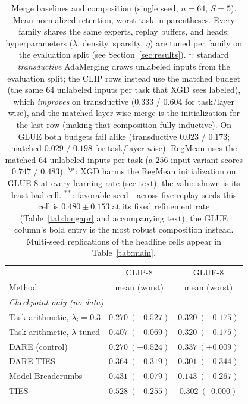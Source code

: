 \documentclass{article} %
\begin{document}
\begin{table}[t]
\centering
\small
\caption{Merge baselines and composition (single seed, $n=64$, $S=5$). Mean normalized retention, worst-task in parentheses. Every family shares the same experts, replay buffers, and heads; hyperparameters ($\lambda$, density, sparsity, $\eta$) are tuned per family on the evaluation split (see Section~\ref{sec:results}). $^\ddagger$: standard \emph{transductive} AdaMerging draws unlabeled inputs from the evaluation split; the CLIP rows instead use the matched budget (the same $64$ unlabeled inputs per task that XGD sees labeled), which \emph{improves} on transductive ($0.333$ / $0.604$ for task/layer wise), and the matched layer-wise merge is the initialization for the last row (making that composition fully inductive). On GLUE both budgets fail alike (transductive $0.023$ / $0.173$; matched $0.029$ / $0.198$ for task/layer wise). RegMean uses the matched $64$ unlabeled inputs per task (a $256$-input variant scores $0.747$ / $0.483$). $^\P$: XGD harms the RegMean initialization on GLUE-8 at every learning rate (see text); the value shown is its least-bad cell. $^{**}$: favorable seed---across five replay seeds this cell is $0.480\pm0.153$ at its fixed refinement rate (Table~\ref{tab:longapr} and accompanying text); the GLUE column's bold entry is the most robust composition instead. Multi-seed replications of the headline cells appear in Table~\ref{tab:main}.}
\label{tab:mergebaselines}
\begin{tabular}{lcc}
\toprule
 & CLIP-8 & GLUE-8 \\
Method & mean (worst) & mean (worst) \\
\midrule
\multicolumn{3}{l}{\emph{Checkpoint-only (no data)}}\\
Task arithmetic, $\lambda_i=0.3$          & $0.270\ (-0.527)$          & $0.320\ (-0.175)$ \\
Task arithmetic, $\lambda$ tuned          & $0.407\ (+0.069)$          & $0.320\ (-0.175)$ \\
DARE (control)                            & $0.270\ (-0.524)$          & $0.337\ (+0.009)$ \\
DARE-TIES                                 & $0.364\ (-0.319)$          & $0.301\ (-0.344)$ \\
Model Breadcrumbs                         & $0.431\ (+0.079)$          & $0.143\ (-0.267)$ \\
TIES                                      & $0.528\ (+0.255)$          & $0.302\ (\ \ 0.000)$ \\

\end{tabular}
\end{table}
\end{document}
